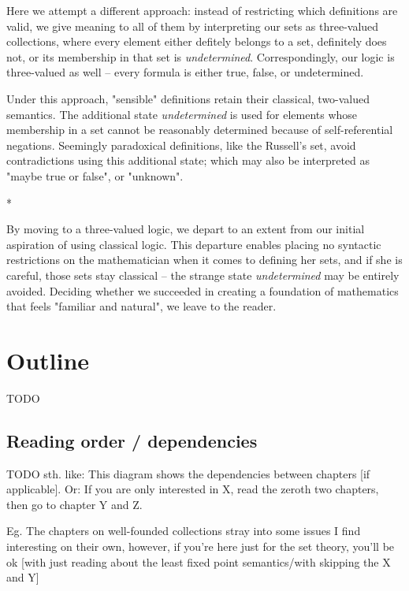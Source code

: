 \documentclass[oneside,12pt]{book}
\theoremstyle{definition}
\theoremstyle{remark}
\newcommand{\sectionStars}{
\bigskip
*\quad*\quad*
\medskip
}
\begin{document}
Here we attempt a different approach: instead of restricting which definitions
are valid, we give meaning to all of them by  interpreting our sets as three-valued
collections, where every element either defitely belongs to a set, definitely
does not, or its membership in that set is \textit{undetermined}.
Correspondingly, our logic is three-valued as well -- every formula is either true,
false, or undetermined.

Under this approach, "sensible" definitions retain their classical, two-valued
semantics. The additional state \textit{undetermined} is used for
elements whose membership in a set cannot be reasonably determined
because of self-referential negations. Seemingly paradoxical definitions, like
the Russell's set, avoid contradictions using this additional
state; which may also be interpreted as "maybe true or false", or "unknown".

\sectionStars


\noindent By moving to a three-valued logic, we depart to an extent from our
initial aspiration of using classical logic. This departure enables placing no
syntactic restrictions on the mathematician when it comes to defining her sets,
and if she is careful, those sets stay classical -- the strange state
\textit{undetermined} may be entirely avoided.
Deciding whether we succeeded in creating a foundation of mathematics that
feels "familiar and natural", we leave to the reader.


\section{Outline}
TODO

\subsection{Reading order / dependencies}
TODO sth. like: This diagram shows the dependencies between chapters
[if applicable]. Or: If you are only interested in X, read the zeroth two
chapters, then go to chapter Y and Z.

Eg. The chapters on well-founded collections stray into some issues I find interesting
on their own, however, if you're here just for the set theory, you'll be ok
[with just reading about the least fixed point semantics/with skipping the X and Y]
\end{document}
